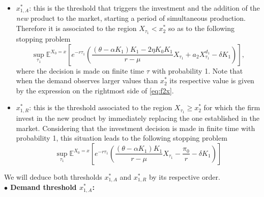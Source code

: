 \begin{itemize}
	\item $x_{1,A}^*$:
	this is the threshold that triggers the investment and the addition of the \textit{new} product to the market, starting a period of simultaneous production. Therefore it is associated to the region $X_{\tau_1} < x^*_2$ so as to the following stopping problem %
	\begin{equation}
	\sup_{\tau_1} \mathds{E}^{X_0=x} \left[ e^{-r \tau_1} \left( \frac{(\theta-\alpha K_1)K_1-2 \eta K_0 K_1}{r-\mu} X_{\tau_1}+
	 a_2 X_{\tau_1}^{d_1} - \delta K_1 \right) \right],
	 \label{3:add}
	 \end{equation}
	 where the decision is made on finite time $\tau$ with probability 1. Note that when the demand observes larger values than $x^*_2$ its respective value is given by the expression on the rightmost side of \eqref{eq:f2x}.
	\item $x_{1,R}^*$: this is the threshold associated to the region $X_{\tau_1} \geq x^*_2$ for which the firm invest in the new product by immediately replacing the one established in the market. Considering that the investment decision is made in finite time with probability 1, this situation leads to the following stopping problem
	\begin{equation}
	\sup_{\tau_1} \mathds{E}^{X_0=x} \left[ e^{-r \tau_1} \left( \frac{(\theta-\alpha K_1)K_1}{r-\mu} X_{\tau_1}-
	\frac{\pi_0}{r} - \delta K_1 \right) \right]
	\label{3:r}
	\end{equation}
\end{itemize}

We will deduce both thresholds $x_{1,A}^*$ and $x_{1,R}^*$ by its respective order.
\\
\textbf{$\bullet$ Demand threshold $x^*_{1,A}$:}

